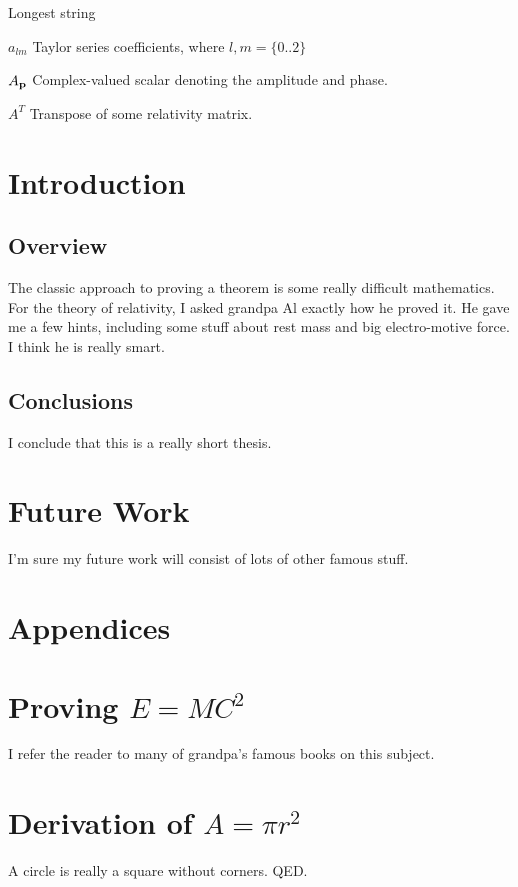 \documentclass[botnum, fleqn]{unmeethesis}
\begin{document}
\tableofcontents
\listoffigures
\listoftables

\begin{glossary}{Longest  string}
   \item[$a_{lm}$]
      Taylor series coefficients, where $l,m = \{0..2\}$
   \item[$A_{\bf{p}}$]
      Complex-valued scalar denoting the amplitude and phase.
   \item[$A^T$]
      Transpose of some relativity matrix.
\end{glossary}

\mainmatter

\chapter{Introduction}
\section{\label{section:overview}Overview}
   The classic approach to proving a theorem is some really difficult 
   mathematics.  For the theory of relativity, I asked grandpa Al exactly 
   how he proved it.  He gave me a few hints, including some stuff about
   rest mass and big electro-motive force.  I think he is really smart.
\section{Conclusions}
   I conclude that this is a really short thesis.

\chapter{Future Work}
   I'm sure my future work will consist of lots of other famous stuff.

\chapter*{Appendices}


\appendix
\chapter{Proving $E=MC^2$}
   I refer the reader to many of grandpa's famous books on this subject.
\chapter{Derivation of $A = \pi r^2$}
   A circle is really a square without corners.  QED.

%
%
\end{document}
